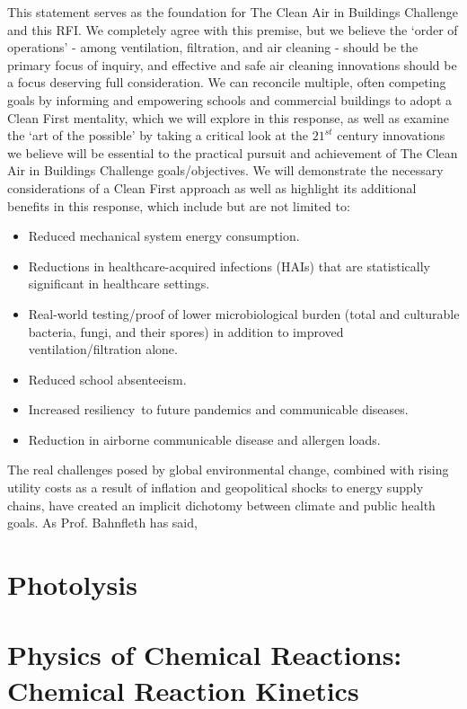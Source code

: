 This statement serves as the foundation for The Clean Air in Buildings Challenge and this RFI. We completely agree with this premise, but we believe the ‘order of operations’ - among ventilation, filtration, and air cleaning - should be the primary focus of inquiry, and effective and safe air cleaning innovations should be a focus deserving full consideration. We can reconcile multiple, often competing goals by informing and empowering schools and commercial buildings to adopt a  Clean First mentality, which we will explore in this response, as well as examine the ‘art of the possible’ by taking a critical look at the $21^{st}$ century innovations we believe will be essential to the practical pursuit and achievement of The Clean Air in Buildings Challenge goals/objectives. We will demonstrate the necessary considerations of a Clean First approach as well as highlight its additional benefits in this response, which include but are not limited to:


\begin{itemize}
\item Reduced mechanical system energy consumption.
\item Reductions in healthcare-acquired infections (HAIs) that are statistically significant in healthcare settings.
\item Real-world testing/proof of lower microbiological burden (total and culturable bacteria, fungi, and their spores) in addition to improved ventilation/filtration alone.
\item Reduced school absenteeism.
\item Increased resiliency to future pandemics and communicable diseases.
\item Reduction in airborne communicable disease and allergen loads.
\end{itemize}


The real challenges posed by global environmental change, combined with rising utility costs as a result of inflation and geopolitical shocks to energy supply chains, have created an implicit dichotomy between climate and public health goals. As Prof. Bahnfleth has said,

\section{Photolysis}


\section{Physics of Chemical Reactions: Chemical Reaction Kinetics}

